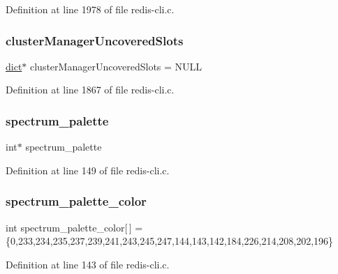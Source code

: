 Definition at line 1978 of file redis-\/cli.\+c.

\mbox{\label{redis-cli_8c_ae685c0b27570c5e930353b89b1a1195e}} 
\subsubsection{\texorpdfstring{cluster\+Manager\+Uncovered\+Slots}{clusterManagerUncoveredSlots}}
{\footnotesize\ttfamily \hyperlink{structdict}{dict}$\ast$ cluster\+Manager\+Uncovered\+Slots = N\+U\+LL}



Definition at line 1867 of file redis-\/cli.\+c.

\mbox{\label{redis-cli_8c_a221e8d721f6f0f04badd0cf2bf40822e}} 
\subsubsection{\texorpdfstring{spectrum\+\_\+palette}{spectrum\_palette}}
{\footnotesize\ttfamily int$\ast$ spectrum\+\_\+palette}



Definition at line 149 of file redis-\/cli.\+c.

\mbox{\label{redis-cli_8c_a1e97bf08246f94fc853f8fcf46c1cf21}} 
\subsubsection{\texorpdfstring{spectrum\+\_\+palette\+\_\+color}{spectrum\_palette\_color}}
{\footnotesize\ttfamily int spectrum\+\_\+palette\+\_\+color\mbox{[}$\,$\mbox{]} = \{0,233,234,235,237,239,241,243,245,247,144,143,142,184,226,214,208,202,196\}}



Definition at line 143 of file redis-\/cli.\+c.

